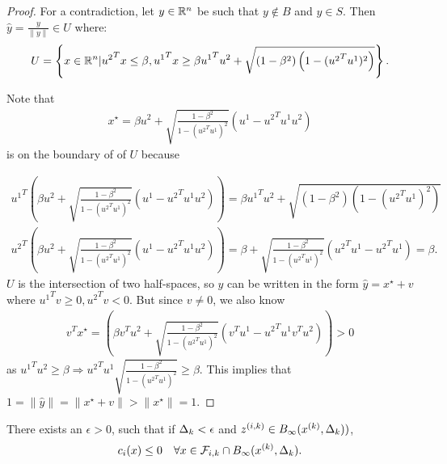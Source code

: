 \begin{proof}
For a contradiction, let $y \in {\mathbb R^{n}}$ be such that $y \not \in B$ and $y \in S$.
Then $\hat y = \frac{y}{\|y\|} \in U$ where:
\begin{align*}
U = \left\{x \in {\mathbb R^{n}} | {u^2}^Tx \le \beta, {u^1}^Tx \ge \beta {u^1}^Tu^2 + \sqrt{(1 - \beta^2)\left(1 - ({u^2}^Tu^1)^2\right)} \right\}.
\end{align*}

Note that
\begin{align*}
x^{\star} = \beta u^2 + \sqrt{\frac{1 - \beta^2}{1 - ({u^2}^Tu^1)^2}} (u^1 - {u^2}^Tu^1 u^2 )
\end{align*}
is on the boundary of of $U$ because

\begin{align*}
{u^1}^T\left(\beta u^2 + \sqrt{\frac{1 - \beta^2}{1 - ({u^2}^Tu^1)^2}} (u^1 - {u^2}^Tu^1 u^2 )\right) = 
\beta {u^1}^Tu^2 + \sqrt{(1 - \beta^2)\left(1 - ({u^2}^Tu^1)^2\right)} \\
{u^2}^T\left(\beta u^2 + \sqrt{\frac{1 - \beta^2}{1 - ({u^2}^Tu^1)^2}} (u^1 - {u^2}^Tu^1 u^2 )\right) = 
\beta + \sqrt{\frac{1 - \beta^2}{1 - ({u^2}^Tu^1)^2}} ({u^2}^Tu^1 - {u^2}^Tu^1 ) = \beta.
\end{align*}
$U$ is the intersection of two half-spaces, so $\hat y$ can be written in the form $\hat y = x^{\star} + v$ where ${u^1}^Tv \ge 0, {u^2}^Tv < 0$.
But since $v \ne 0$, we also know
\begin{align*}
{v}^Tx^{\star} = 
\left(\beta {v}^Tu^2 + \sqrt{\frac{1 - \beta^2}{1 - ({u^2}^Tu^1)^2}} ({v}^Tu^1 - {u^2}^Tu^1 {v}^Tu^2 )\right) > 0
\end{align*}
as ${u^1}^Tu^2 \ge \beta \Longrightarrow {u^2}^Tu^1\sqrt{\frac{1 - \beta^2}{1 - ({u^2}^Tu^1)^2}} \ge \beta$.
This implies that $1 = \|\hat y\| = \|x^{\star} + v\| > \|x^{\star}\| = 1$.
\end{proof}






\begin{theorem}
There exists an $\epsilon > 0$, such that if $\Delta_k < \epsilon$ and $z^{(i, k)} \in B_{\infty}({x^{(k)}}, \Delta_k))$,
\begin{align*}
c_i(x) \le 0 \quad \forall x \in {\mathcal F_{i, k}} \cap B_{\infty}({x^{(k)}}, \Delta_k).
\end{align*}

\end{theorem}

